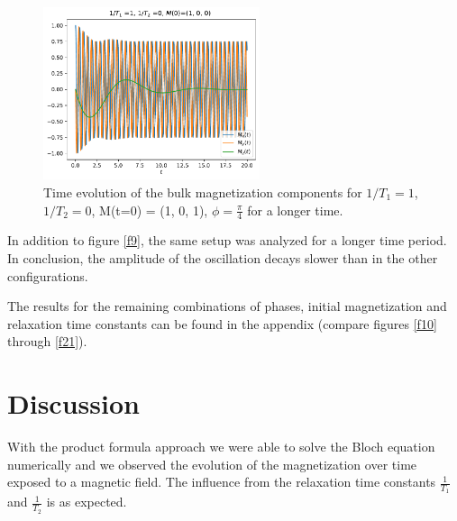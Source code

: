 \documentclass[journal]{IEEEtran} %
\begin{document}
\begin{figure}[H]
\centering
\includegraphics[width=2.5in]{figs/NMR_T1-1_T2-0_Minit-100_tau_0.01_t_20.pdf}
\caption{Time evolution of the bulk magnetization components for $1/T_1 = 1$, $1/T_2 = 0$, M(t=0) = (1, 0, 1), $\phi = \frac{\pi}{4}$ for a longer time.}
\label{flonger}
\end{figure}
In addition to figure \ref{f9}, the same setup was analyzed for a longer time period. In conclusion, the amplitude of the oscillation decays slower than in the other configurations.   

The results for the remaining combinations of phases, initial magnetization and relaxation time constants can be found in the appendix (compare figures \ref{f10} through \ref{f21}).

\section{Discussion}

With the product formula approach we were able to solve the Bloch equation numerically and we observed the evolution of the magnetization over time exposed to a magnetic field. The influence from the relaxation time constants $\frac{1}{T_1}$ and $\frac{1}{T_2}$ is as expected.  

\clearpage
\end{document}
